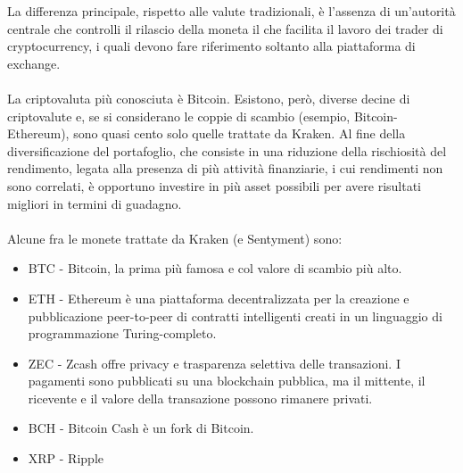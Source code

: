 \documentclass[a4paper,12pt]{report}
\begin{document}
La differenza principale, rispetto alle valute tradizionali, è l'assenza di un'autorità centrale che controlli il rilascio della moneta il che facilita il lavoro dei trader di cryptocurrency, i quali devono fare riferimento soltanto alla piattaforma di exchange.\\~\\ La criptovaluta più conosciuta è Bitcoin. Esistono, però, diverse decine di criptovalute e, se si considerano le coppie di scambio (esempio, Bitcoin-Ethereum), sono quasi cento solo quelle trattate da Kraken. Al fine della diversificazione del portafoglio, che consiste in una riduzione della rischiosità del rendimento, legata alla presenza di più attività finanziarie, i cui rendimenti non sono correlati, è opportuno investire in più asset possibili per avere risultati migliori in termini di guadagno.\\~\\Alcune fra le monete trattate da Kraken (e Sentyment) sono:
\begin{itemize}
	\item BTC - Bitcoin, la prima più famosa e col valore di scambio più alto.
	\item ETH - Ethereum è una piattaforma decentralizzata per la creazione e pubblicazione peer-to-peer di contratti intelligenti creati in un linguaggio di programmazione Turing-completo.
	\item ZEC - Zcash offre privacy e trasparenza selettiva delle transazioni. I pagamenti sono pubblicati su una blockchain pubblica, ma il mittente, il ricevente e il valore della transazione possono rimanere privati.
	\item BCH - Bitcoin Cash è un fork di Bitcoin.
	\item XRP - Ripple
\end{itemize}
\end{document}
